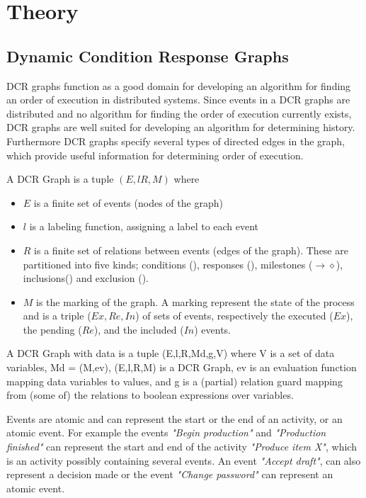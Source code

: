 \chapter{Theory}\label{chap:theory}
	\section{Dynamic Condition Response Graphs}
	DCR graphs function as a good domain for developing an algorithm for finding an order of execution in distributed systems. Since events in a DCR graphs are distributed and no algorithm for finding the order of execution currently exists, DCR graphs are well suited for developing an algorithm for determining history. 
	Furthermore DCR graphs specify several types of directed edges in the graph, which provide useful information for determining order of execution.
	
	\begin{definition}
		A DCR Graph is a tuple $(E, l R, M)$ where
		\begin{itemize}
			\item $E$ is a finite set of events (nodes of the graph)
			\item $l$ is a labeling function, assigning a label to each event
			\item $R$ is a finite set of relations between events (edges of the graph). These are partitioned into five kinds; conditions (\condition), responses (\response), milestones ($\rightarrow\!\!\!\diamond$), inclusions(\inclusion) and exclusion (\exclusion).
			\item $M$ is the marking of the graph. A marking represent the state of the process and is a triple ($Ex,Re,In$) of sets of events, respectively the executed ($Ex$), the pending ($Re$), and the included ($In$) events.
		\end{itemize}
		A DCR Graph with data is a tuple (E,l,R,Md,g,V) where V is a set of data variables, Md = (M,ev), (E,l,R,M) is a DCR Graph, ev is an evaluation function mapping data variables to values, and g is a (partial) relation guard mapping from (some of) the relations to boolean expressions over variables. 
	\end{definition}
	Events are atomic and can represent the start or the end of an activity, or an atomic event. 
	For example the events \textit{"Begin production"} and \textit{"Production finished"} can represent the start and end of the activity \textit{"Produce item X"}, which is an activity possibly containing several events. An event \textit{"Accept draft"}, can also represent a decision made or the event \textit{"Change password"} can represent an atomic event.
	

